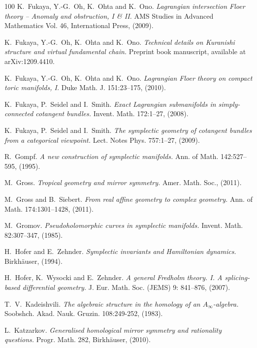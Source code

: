 \begin{thebibliography}{100}
K.~Fukaya, Y.-G.~Oh, K.~Ohta and K.~Ono.
\emph{Lagrangian intersection Floer theory -- Anomaly and obstruction, I \& II.}
AMS Studies in Advanced Mathematics Vol. 46, International Press, (2009).

K.~Fukaya, Y.-G.~Oh, K.~Ohta and K.~Ono.
\emph{Technical details on Kuranishi structure and virtual fundamental chain.}
Preprint book manuscript, available at arXiv:1209.4410.

K.~Fukaya, Y.-G.~Oh, K.~Ohta and K.~Ono.
\emph{Lagrangian Floer theory on compact toric manifolds, I.}
Duke Math. J. 151:23--175,  (2010).

K.~Fukaya, P.~Seidel and I.~Smith.
\emph{Exact Lagrangian submanifolds in simply-connected cotangent bundles.}
Invent. Math. 172:1--27, (2008).

K.~Fukaya, P.~Seidel and I.~Smith.
\emph{The symplectic geometry of cotangent bundles from a categorical viewpoint.}
Lect. Notes Phys. 757:1--27, (2009).

R.~Gompf.
\emph{A new construction of symplectic manifolds.}
Ann. of Math. 142:527--595, (1995).

M.~Gross.
\emph{Tropical geometry and mirror symmetry.}
Amer. Math. Soc., (2011).

M.~Gross and B.~Siebert.
\emph{From real affine geometry to complex geometry.}
Ann. of Math. 174:1301--1428, (2011).

M.~Gromov.
\emph{Pseudoholomorphic curves in symplectic manifolds.}
Invent. Math. 82:307--347, (1985).


H.~Hofer and E.~Zehnder.
\emph{Symplectic invariants and Hamiltonian dynamics.}
Birkh\"auser, (1994).

H.~Hofer, K.~Wysocki and  E.~Zehnder.
\emph{A general Fredholm theory. I. A splicing-based differential geometry.}
J. Eur. Math. Soc. (JEMS) 9: 841--876, (2007).

T.~V.~Kadeishvili.
\emph{The algebraic structure in the homology of an $A_{\infty}$-algebra.}
Soobshch. Akad. Nauk. Gruzin. 108:249-252, (1983).

L.~Katzarkov.
\emph{Generalised homological mirror symmetry and rationality questions.}
Progr. Math. 282, Birkh\"auser, (2010).


\end{thebibliography}

